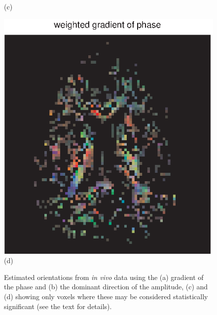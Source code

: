 \documentclass[authoryear,preprint,12pt]{elsarticle}
\begin{document}
\begin{figure}[p]
\begin{center}
\begin{minipage}[]{0.42\textwidth}
        (c)
    \end{minipage}
      \begin{minipage}[]{0.42\textwidth}
      \centering
      \includegraphics[width=\textwidth]{gradphase55dny.eps}
      (d)
    \end{minipage}
  \end{center}
  \caption{Estimated orientations from \textit{in vivo} data using the
    (a) gradient of the phase and (b) the dominant direction of the
    amplitude, (c) and (d) showing only voxels where these may be
    considered statistically significant (see the text for details).}
  \label{fig1c} 
\end{figure}
\end{document}

